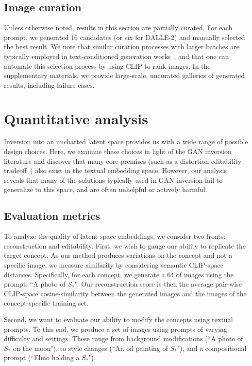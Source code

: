 \subsection{Image curation}

Unless otherwise noted, results in this section are partially curated. For each prompt, we generated $16$ candidates (or six for DALLE-2) and manually selected the best result. We note that similar curation processes with larger batches are typically employed in text-conditioned generation works~\citep{avrahami2022blended,ramesh2021zero,yu2022scaling}, and that one can automate this selection process by using CLIP to rank images. In the supplementary materials, we provide large-scale, uncurated galleries of generated results, including failure cases.

\section{Quantitative analysis}
\label{sec:analysis}

Inversion into an uncharted latent space provides us with a wide range of possible design choices. Here, we examine these choices in light of the GAN inversion literature and discover that many core premises (such as a distortion-editability tradeoff~\citep{tov2021designing,zhu2020improved}) also exist in the textual embedding space. However, our analysis reveals that many of the solutions typically used in GAN inversion fail to generalize to this space, and are often unhelpful or actively harmful.

\subsection{Evaluation metrics}

To analyze the quality of latent space embeddings, we consider two fronts: reconstruction and editability. First, we wish to gauge our ability to replicate the target concept. As our method produces variations on the concept and not a specific image, we measure similarity by considering semantic CLIP-space distances. Specifically, for each concept, we generate a $64$ of images using the prompt: ``A photo of $S_*$". Our reconstruction score is then the average pair-wise CLIP-space cosine-similarity between the generated images and the images of the concept-specific training set.

Second, we want to evaluate our ability to modify the concepts using textual prompts. To this end, we produce a set of images using prompts of varying difficulty and settings. These range from background modifications (``A photo of $S_*$ on the moon"), to style changes (``An oil painting of $S_*$"), and a compositional prompt (``Elmo holding a $S_*$"). 

